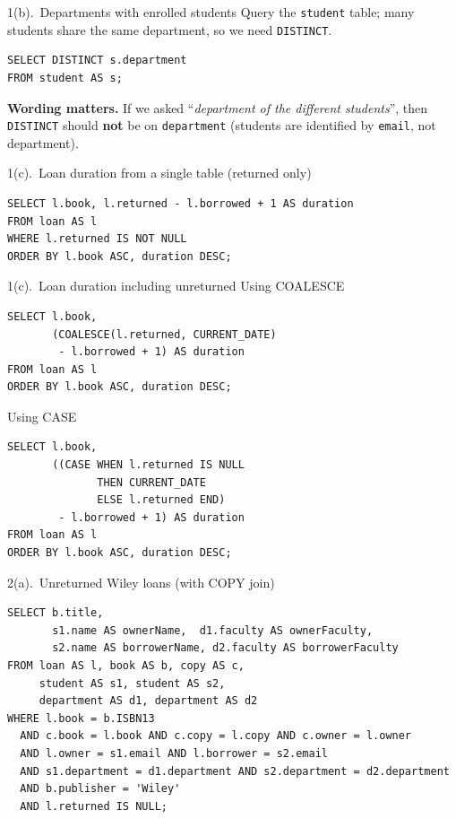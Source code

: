 \documentclass{beamer}
\begin{document}
\begin{frame}[fragile]{1(b).\ Departments with enrolled students}
\small
Query the \texttt{student} table; many students share the same department, so we need \texttt{DISTINCT}.
\begin{lstlisting}
SELECT DISTINCT s.department
FROM student AS s;
\end{lstlisting}
\textbf{Wording matters.} If we asked “\emph{department of the different students}”, then \texttt{DISTINCT} should \textbf{not} be on \texttt{department} (students are identified by \texttt{email}, not department).
\end{frame}

\begin{frame}[fragile]{1(c).\ Loan duration from a single table (returned only)}
\small
\begin{lstlisting}[style=sqlcompact]  % compact style avoids wrapping/overflow
SELECT l.book, l.returned - l.borrowed + 1 AS duration
FROM loan AS l
WHERE l.returned IS NOT NULL
ORDER BY l.book ASC, duration DESC;
\end{lstlisting}
\end{frame}

\begin{frame}[fragile]{1(c).\ Loan duration including unreturned}
\small Using COALESCE
\begin{lstlisting}[style=sqlcompact]
SELECT l.book,
       (COALESCE(l.returned, CURRENT_DATE)
        - l.borrowed + 1) AS duration
FROM loan AS l
ORDER BY l.book ASC, duration DESC;
\end{lstlisting}

\medskip Using CASE
\begin{lstlisting}[style=sqlcompact]
SELECT l.book,
       ((CASE WHEN l.returned IS NULL
              THEN CURRENT_DATE
              ELSE l.returned END)
        - l.borrowed + 1) AS duration
FROM loan AS l
ORDER BY l.book ASC, duration DESC;
\end{lstlisting}
\end{frame}

\begin{frame}[fragile]{2(a).\ Unreturned Wiley loans (with COPY join)}
\small
\begin{lstlisting}[style=sqlcompact]
SELECT b.title,
       s1.name AS ownerName,  d1.faculty AS ownerFaculty,
       s2.name AS borrowerName, d2.faculty AS borrowerFaculty
FROM loan AS l, book AS b, copy AS c,
     student AS s1, student AS s2,
     department AS d1, department AS d2
WHERE l.book = b.ISBN13
  AND c.book = l.book AND c.copy = l.copy AND c.owner = l.owner
  AND l.owner = s1.email AND l.borrower = s2.email
  AND s1.department = d1.department AND s2.department = d2.department
  AND b.publisher = 'Wiley'
  AND l.returned IS NULL;
\end{lstlisting}
\end{frame}
\end{document}
